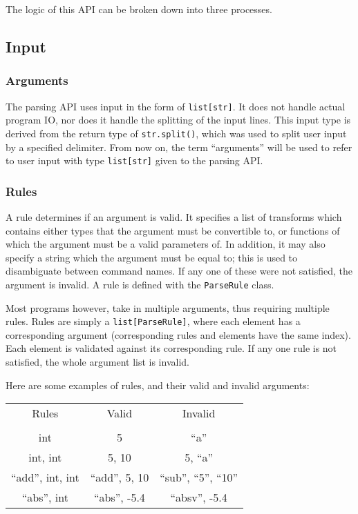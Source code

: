 \documentclass{article}
\begin{document}
		The logic of this API can be broken down into three processes.

		\subsection{Input}
			\subsubsection{Arguments}
				The parsing API uses input in the form of \verb|list[str]|. It does not handle
				actual program IO, nor does it handle the splitting of the input lines. This
				input type is derived from the return type of \verb|str.split()|, which was
				used to split user input by a specified delimiter. From now on, the term
				``arguments'' will be used to refer to user input with type \verb|list[str]|
				given to the parsing API\@.

			\subsubsection{Rules}
				A rule determines if an argument is valid. It specifies a list of transforms which
				contains either types that the argument must be convertible to, or functions of
				which the argument must be a valid parameters of. In addition, it may also specify
				a string which the argument must be equal to; this is used to disambiguate between
				command names. If any one of these were not satisfied, the argument is invalid. A
				rule is defined with the \verb|ParseRule| class.

				Most programs however, take in multiple arguments, thus requiring multiple rules.
				Rules are simply a \verb|list[ParseRule]|, where each element has a corresponding
				argument (corresponding rules and elements have the same index). Each element is
				validated against its corresponding rule. If any one rule is not satisfied, the
				whole argument list is invalid.

				Here are some examples of rules, and their valid and invalid arguments:

				\begin{center}
					\begin{tabular}{c c c}
						Rules & Valid & Invalid \\
						\\
							int & 5 & ``a''
						\\
							int, int & 5, 10 & 5, ``a''
						\\
							``add'', int, int & ``add'', 5, 10 & ``sub'', ``5'', ``10''
						\\
							``abs'', int & ``abs'', -5.4 & ``absv'', -5.4
						\\
					\end{tabular}
				\end{center}
\end{document}

